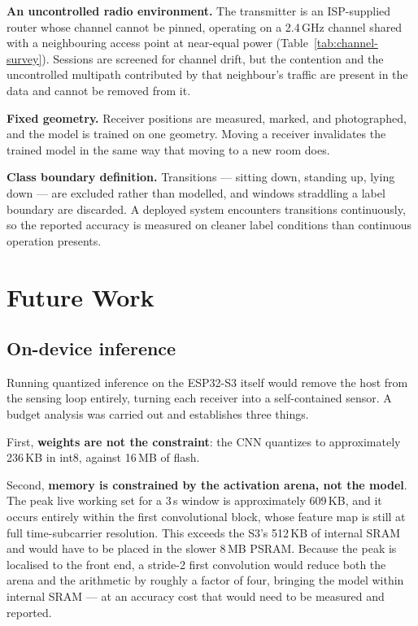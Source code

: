 \textbf{An uncontrolled radio environment.} The transmitter is an
ISP-supplied router whose channel cannot be pinned, operating on a 2.4\,GHz
channel shared with a neighbouring access point at near-equal power
(Table~\ref{tab:channel-survey}). Sessions are screened for channel drift,
but the contention and the uncontrolled multipath contributed by that
neighbour's traffic are present in the data and cannot be removed from it.

\textbf{Fixed geometry.} Receiver positions are measured, marked, and
photographed, and the model is trained on one geometry. Moving a receiver
invalidates the trained model in the same way that moving to a new room
does.

\textbf{Class boundary definition.} Transitions --- sitting down, standing
up, lying down --- are excluded rather than modelled, and windows straddling
a label boundary are discarded. A deployed system encounters transitions
continuously, so the reported accuracy is measured on cleaner label
conditions than continuous operation presents.

\section{Future Work}

\subsection{On-device inference}

Running quantized inference on the ESP32-S3 itself would remove the host
from the sensing loop entirely, turning each receiver into a self-contained
sensor. A budget analysis was carried out and establishes three things.

First, \textbf{weights are not the constraint}: the CNN quantizes to
approximately 236\,KB in int8, against 16\,MB of flash.

Second, \textbf{memory is constrained by the activation arena, not the
model}. The peak live working set for a 3\,s window is approximately
609\,KB, and it occurs entirely within the first convolutional block, whose
feature map is still at full time-subcarrier resolution. This exceeds the
S3's 512\,KB of internal SRAM and would have to be placed in the slower
8\,MB PSRAM. Because the peak is localised to the front end, a stride-2
first convolution would reduce both the arena and the arithmetic by roughly
a factor of four, bringing the model within internal SRAM --- at an accuracy
cost that would need to be measured and reported.

